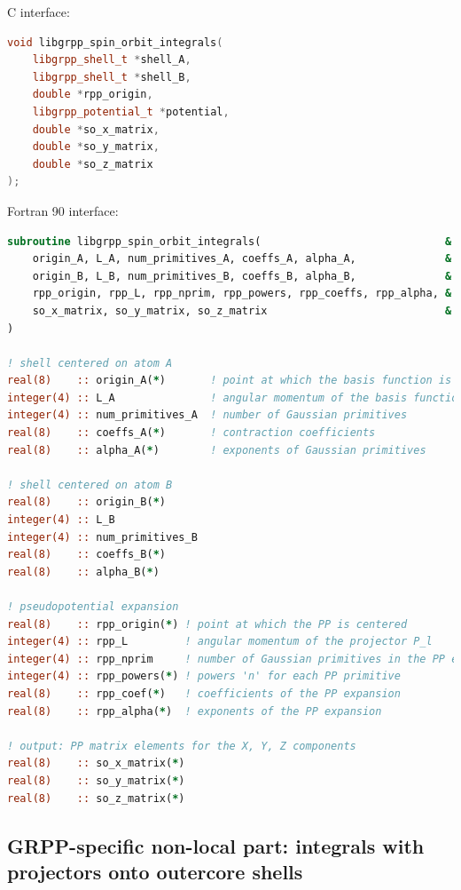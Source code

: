 \documentclass[12pt]{article}
\begin{document}
C interface:
\begin{lstlisting}[language=C++]
void libgrpp_spin_orbit_integrals(
    libgrpp_shell_t *shell_A,
    libgrpp_shell_t *shell_B,
    double *rpp_origin,
    libgrpp_potential_t *potential,
    double *so_x_matrix,
    double *so_y_matrix,
    double *so_z_matrix
);
\end{lstlisting}

Fortran 90 interface:
\begin{lstlisting}[language=Fortran]
subroutine libgrpp_spin_orbit_integrals(                             &
    origin_A, L_A, num_primitives_A, coeffs_A, alpha_A,              &
    origin_B, L_B, num_primitives_B, coeffs_B, alpha_B,              &
    rpp_origin, rpp_L, rpp_nprim, rpp_powers, rpp_coeffs, rpp_alpha, &
    so_x_matrix, so_y_matrix, so_z_matrix                            &
)

! shell centered on atom A
real(8)    :: origin_A(*)       ! point at which the basis function is centered
integer(4) :: L_A               ! angular momentum of the basis function
integer(4) :: num_primitives_A  ! number of Gaussian primitives
real(8)    :: coeffs_A(*)       ! contraction coefficients
real(8)    :: alpha_A(*)        ! exponents of Gaussian primitives

! shell centered on atom B
real(8)    :: origin_B(*)
integer(4) :: L_B
integer(4) :: num_primitives_B
real(8)    :: coeffs_B(*)
real(8)    :: alpha_B(*)

! pseudopotential expansion
real(8)    :: rpp_origin(*) ! point at which the PP is centered
integer(4) :: rpp_L         ! angular momentum of the projector P_l
integer(4) :: rpp_nprim     ! number of Gaussian primitives in the PP expansion
integer(4) :: rpp_powers(*) ! powers 'n' for each PP primitive
real(8)    :: rpp_coef(*)   ! coefficients of the PP expansion
real(8)    :: rpp_alpha(*)  ! exponents of the PP expansion

! output: PP matrix elements for the X, Y, Z components
real(8)    :: so_x_matrix(*)
real(8)    :: so_y_matrix(*)
real(8)    :: so_z_matrix(*)
\end{lstlisting}



\subsection{GRPP-specific non-local part: integrals with projectors onto outercore shells}
\end{document}
